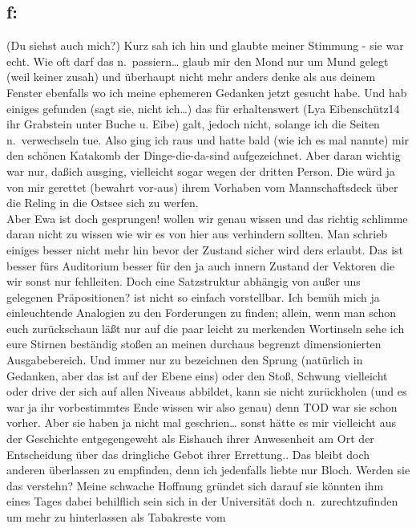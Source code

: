 \documentclass[
]{article}
\author{}
\date{\vspace{-2.5em}}
\begin{document}
\subsection{f:}\label{f}

(Du siehst auch mich?) Kurz sah ich hin und glaubte meiner Stimmung -
sie war echt. Wie oft darf das n.~passiern\ldots{} glaub mir den Mond
nur um Mund gelegt (weil keiner zusah) und überhaupt nicht mehr anders
denke als aus deinem Fenster ebenfalls wo ich meine ephemeren Gedanken
jetzt gesucht habe. Und hab einiges gefunden (sagt sie, nicht ich\ldots)
das für erhaltenswert (Lya Eibenschütz14 ihr Grabstein unter Buche u.
Eibe) galt, jedoch nicht, solange ich die Seiten n.~verwechseln tue.
Also ging ich raus und hatte bald (wie ich es mal nannte) mir den
schönen Katakomb der Dinge-die-da-sind aufgezeichnet. Aber daran wichtig
war nur, daßich ausging, vielleicht sogar wegen der dritten Person. Die
würd ja von mir gerettet (bewahrt vor-aus) ihrem Vorhaben vom
Mannschaftsdeck über die Reling in die Ostsee sich zu werfen.\\
Aber Ewa ist doch gesprungen! wollen wir genau wissen und das richtig
schlimme daran nicht zu wissen wie wir es von hier aus verhindern
sollten. Man schrieb einiges besser nicht mehr hin bevor der Zustand
sicher wird ders erlaubt. Das ist besser fürs Auditorium besser für den
ja auch innern Zustand der Vektoren die wir sonst nur fehlleiten. Doch
eine Satzstruktur abhängig von außer uns gelegenen Präpositionen? ist
nicht so einfach vorstellbar. Ich bemüh mich ja einleuchtende Analogien
zu den Forderungen zu finden; allein, wenn man schon euch zurückschaun
läßt nur auf die paar leicht zu merkenden Wortinseln sehe ich eure
Stirnen beständig stoßen an meinen durchaus begrenzt dimensionierten
Ausgabebereich. Und immer nur zu bezeichnen den Sprung (natürlich in
Gedanken, aber das ist auf der Ebene eins) oder den Stoß, Schwung
vielleicht oder drive der sich auf allen Niveaus abbildet, kann sie
nicht zurückholen (und es war ja ihr vorbestimmtes Ende wissen wir also
genau) denn TOD war sie schon vorher. Aber sie haben ja nicht mal
geschrien\ldots{} sonst hätte es mir vielleicht aus der Geschichte
entgegengeweht als Eishauch ihrer Anwesenheit am Ort der Entscheidung
über das dringliche Gebot ihrer Errettung.. Das bleibt doch anderen
überlassen zu empfinden, denn ich jedenfalls liebte nur Bloch. Werden
sie das verstehn? Meine schwache Hoffnung gründet sich darauf sie
könnten ihm eines Tages dabei behilflich sein sich in der Universität
doch n.~zurechtzufinden um mehr zu hinterlassen als Tabakreste vom
\end{document}
